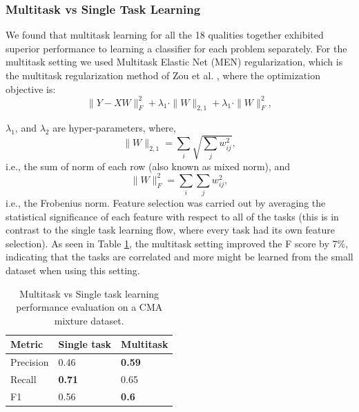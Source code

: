 \documentclass[11pt,twocolumn,varwidth=true,a4paper,fleqn]{article}
\begin{document}
\subsubsection{Multitask vs Single Task Learning}
We found that multitask learning for all the 18 qualities together exhibited superior 
performance to learning a classifier for each problem separately. For the
multitask setting we used Multitask Elastic Net (MEN) regularization, which is
the multitask regularization method of Zou et al. \cite{Zou}, where the
optimization objective is:
\\
\begin{equation}\label{eq:MEN}
	\|Y - XW\|^2_F+\lambda_1\cdot\|W\|_{2,1}+\lambda_1\cdot\|W\|^2_F,
\end{equation}    
  
$\lambda_1$, and $\lambda_2$ are hyper-parameters, where,
\\
\begin{equation*}
        \|W\|_{2,1} = \sum_i \sqrt{\sum_j w_{ij}^2},
\end{equation*} 
    i.e., the sum of norm of each row (also known as mixed norm), and 
\begin{equation*}
        \|W\|^2_F = \sum_i{\sum_j w_{ij}^2},
\end{equation*}     
	i.e., the Frobenius norm. 
Feature selection was carried out by averaging the statistical significance of
each feature with respect to all of the tasks (this is in contrast to the single
task learning flow, where every task had its own feature selection). As seen in
Table \ref{MultitaskVsSeparated}, the multitask setting improved the F score by
7\%, indicating that the tasks are correlated and more might be learned
from the small dataset when using this setting.	
 	\begin{table}[ht]
	  	\centering
		\begin{tabular}{|p{1.8cm}|p{1.8cm}|p{1.8cm}|}
		\hline
		Metric&Single task&Multitask\\\hline
		Precision&0.46&\textbf{0.59}\\\hline
		Recall&\textbf{0.71}&0.65\\\hline
		F1&0.56&\textbf{0.6}\\\hline
		\end{tabular}
		\caption{Multitask vs Single task learning performance evaluation on a CMA mixture
		dataset.}
	   \label{MultitaskVsSeparated}
	\end{table}
\end{document}
